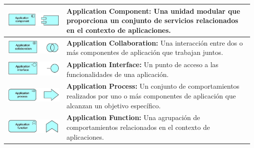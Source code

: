 \begin{longtable}{|c|p{8cm}|}
	\endlastfoot
	\includegraphics{anexos/ARCHI/application/component.png}     &
	\textbf{Application Component:} Una unidad modular que proporciona un conjunto de servicios relacionados en el contexto de aplicaciones.             \\
	\hline
	\includegraphics{anexos/ARCHI/application/collaboration.png} &
	\textbf{Application Collaboration:} Una interacción entre dos o más componentes de aplicación que trabajan juntos.                                   \\
	\hline
	\includegraphics{anexos/ARCHI/application/interface.png}     &
	\textbf{Application Interface:} Un punto de acceso a las funcionalidades de una aplicación.                                                          \\
	\hline
	\includegraphics{anexos/ARCHI/application/process.png}       &
	\textbf{Application Process:} Un conjunto de comportamientos realizados por uno o más componentes de aplicación que alcanzan un objetivo específico. \\
	\hline
	\includegraphics{anexos/ARCHI/application/function.png}      &
	\textbf{Application Function:} Una agrupación de comportamientos relacionados en el contexto de aplicaciones.                                        \\

\end{longtable}
